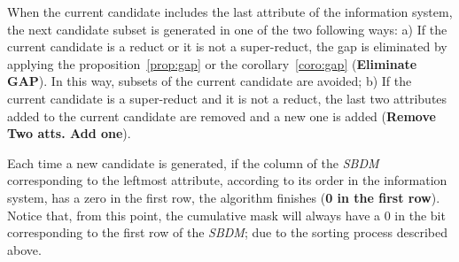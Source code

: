 \documentclass[number,preprint,review,12pt]{elsarticle}
\begin{document}
	When the current candidate includes the last attribute of the information system, the next candidate subset is generated in one of the two following ways: a) If the current candidate is a reduct or it is not a super-reduct, the gap is eliminated by applying the proposition~\ref{prop:gap} or the corollary~\ref{coro:gap} (\textbf{Eliminate GAP}). In this way, subsets of the current candidate are avoided; b) If the current candidate is a super-reduct and it is not a reduct, the last two attributes added to the current candidate are removed and a new one is added (\textbf{Remove Two atts. Add one}).
	
	Each time a new candidate is generated, if the column of the \textit{SBDM} corresponding to the leftmost attribute, according to its order in the information system, has a zero in the first row, the algorithm finishes (\textbf{0 in the first row}). Notice that, from this point, the cumulative mask will always have a 0 in the bit corresponding to the first row of the \textit{SBDM}; due to the sorting process described above.
	
		
\end{document}
